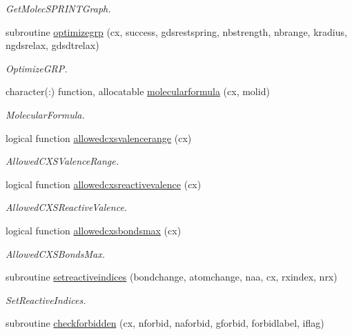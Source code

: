 \begin{DoxyCompactItemize}
\begin{DoxyCompactList}\small\item\em Get\+Molec\+S\+P\+R\+I\+N\+T\+Graph. \end{DoxyCompactList}\item 
subroutine \mbox{\hyperlink{namespacechemstr_aa5bcf84cda1282afd18a5ebae91c3fd4}{optimizegrp}} (cx, success, gdsrestspring, nbstrength, nbrange, kradius, ngdsrelax, gdsdtrelax)
\begin{DoxyCompactList}\small\item\em Optimize\+G\+RP. \end{DoxyCompactList}\item 
character(\+:) function, allocatable \mbox{\hyperlink{namespacechemstr_a6659644537a7765bec46320eb5fbf579}{molecularformula}} (cx, molid)
\begin{DoxyCompactList}\small\item\em Molecular\+Formula. \end{DoxyCompactList}\item 
logical function \mbox{\hyperlink{namespacechemstr_aadd8f96c5bf2487db486c507835a660d}{allowedcxsvalencerange}} (cx)
\begin{DoxyCompactList}\small\item\em Allowed\+C\+X\+S\+Valence\+Range. \end{DoxyCompactList}\item 
logical function \mbox{\hyperlink{namespacechemstr_a02c610963e45aa224298fd48ff988cb2}{allowedcxsreactivevalence}} (cx)
\begin{DoxyCompactList}\small\item\em Allowed\+C\+X\+S\+Reactive\+Valence. \end{DoxyCompactList}\item 
logical function \mbox{\hyperlink{namespacechemstr_aaa24f03941c25ca1496329ce1ad0a755}{allowedcxsbondsmax}} (cx)
\begin{DoxyCompactList}\small\item\em Allowed\+C\+X\+S\+Bonds\+Max. \end{DoxyCompactList}\item 
subroutine \mbox{\hyperlink{namespacechemstr_a33a9d23a89f4fc1c8d91dceac19c6e32}{setreactiveindices}} (bondchange, atomchange, naa, cx, rxindex, nrx)
\begin{DoxyCompactList}\small\item\em Set\+Reactive\+Indices. \end{DoxyCompactList}\item 
subroutine \mbox{\hyperlink{namespacechemstr_abd5d6fd872f03496b78e8456a6788297}{checkforbidden}} (cx, nforbid, naforbid, gforbid, forbidlabel, iflag)

\end{DoxyCompactItemize}
